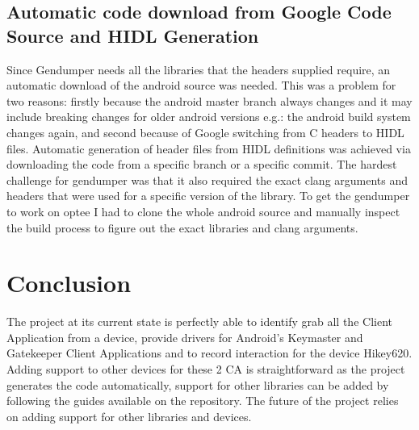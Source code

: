 \documentclass[a4paper,11pt,oneside]{report}
\begin{document}
\section{Automatic code download from Google Code Source and HIDL Generation}
Since Gendumper needs all the libraries that the
headers supplied require, an automatic download of
the android source was needed. This was a problem for
two reasons: firstly because the android master branch always changes and it may include breaking changes for
older android versions e.g.: the android build system changes again, and second because of Google switching from C headers to HIDL files. Automatic generation of header files from HIDL definitions was achieved via downloading the code from a specific branch or a specific commit. The hardest challenge for gendumper was that it also required the exact clang arguments and headers that were used for a specific version of the library. To get the gendumper to work on optee I had to
clone the whole android source and manually inspect the build process to figure out the exact libraries and clang arguments.
\chapter{Conclusion}
The project at its current state is perfectly able to
identify grab all the Client Application from a device,
provide drivers for Android's Keymaster and Gatekeeper Client Applications and to record interaction for the device Hikey620. Adding support to other devices for these 2 CA is straightforward as the project generates the code automatically, support for other libraries can be added by following the guides available on the repository. The future of the project relies on adding support for other libraries and devices.

\cleardoublepage
{}
{}
\printbibliography

%
%
\end{document}
